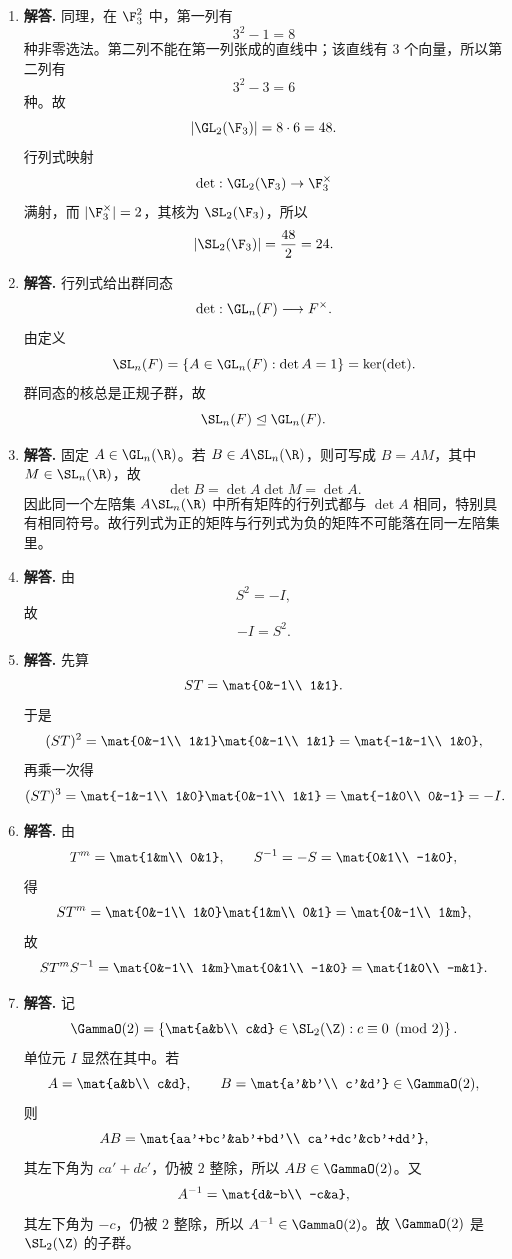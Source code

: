 \begin{enumerate}[label=\textbf{\arabic*.}, leftmargin=*, itemsep=1em]
\item \textbf{解答.} 同理，在 $\F_3^2$ 中，第一列有
\[
3^2-1=8
\]
种非零选法。第二列不能在第一列张成的直线中；该直线有 $3$ 个向量，所以第二列有
\[
3^2-3=6
\]
种。故
\[
|\GL_2(\F_3)|=8\cdot 6=48.
\]
行列式映射
\[
\det:\GL_2(\F_3)\to \F_3^\times
\]
满射，而 $|\F_3^\times|=2$，其核为 $\SL_2(\F_3)$，所以
\[
|\SL_2(\F_3)|=\frac{48}{2}=24.
\]

\item \textbf{解答.} 行列式给出群同态
\[
\det:\GL_n(F)\longrightarrow F^\times.
\]
由定义
\[
\SL_n(F)=\{A\in \GL_n(F):\det A=1\}=\ker(\det).
\]
群同态的核总是正规子群，故
\[
\SL_n(F)\trianglelefteq \GL_n(F).
\]

\item \textbf{解答.} 固定 $A\in \GL_n(\R)$。若 $B\in A\SL_n(\R)$，则可写成 $B=AM$，其中 $M\in \SL_n(\R)$，故
\[
\det B=\det A\det M=\det A.
\]
因此同一个左陪集 $A\SL_n(\R)$ 中所有矩阵的行列式都与 $\det A$ 相同，特别具有相同符号。故行列式为正的矩阵与行列式为负的矩阵不可能落在同一左陪集里。

\item \textbf{解答.} 由
\[
S^2=-I,
\]
故
\[
-I=S^2.
\]

\item \textbf{解答.} 先算
\[
ST=\mat{0&-1\\ 1&1}.
\]
于是
\[
(ST)^2=\mat{0&-1\\ 1&1}\mat{0&-1\\ 1&1}
=\mat{-1&-1\\ 1&0},
\]
再乘一次得
\[
(ST)^3=\mat{-1&-1\\ 1&0}\mat{0&-1\\ 1&1}
=\mat{-1&0\\ 0&-1}=-I.
\]

\item \textbf{解答.} 由
\[
T^m=\mat{1&m\\ 0&1},\qquad S^{-1}=-S=\mat{0&1\\ -1&0},
\]
得
\[
ST^m=\mat{0&-1\\ 1&0}\mat{1&m\\ 0&1}
=\mat{0&-1\\ 1&m},
\]
故
\[
ST^mS^{-1}
=\mat{0&-1\\ 1&m}\mat{0&1\\ -1&0}
=\mat{1&0\\ -m&1}.
\]

\item \textbf{解答.} 记
\[
\GammaO(2)=\left\{\mat{a&b\\ c&d}\in \SL_2(\Z):c\equiv 0\pmod 2\right\}.
\]
单位元 $I$ 显然在其中。若
\[
A=\mat{a&b\\ c&d},\qquad B=\mat{a'&b'\\ c'&d'}\in \GammaO(2),
\]
则
\[
AB=\mat{aa'+bc'&ab'+bd'\\ ca'+dc'&cb'+dd'},
\]
其左下角为 $ca'+dc'$，仍被 $2$ 整除，所以 $AB\in\GammaO(2)$。又
\[
A^{-1}=\mat{d&-b\\ -c&a},
\]
其左下角为 $-c$，仍被 $2$ 整除，所以 $A^{-1}\in\GammaO(2)$。故 $\GammaO(2)$ 是 $\SL_2(\Z)$ 的子群。


\end{enumerate}
